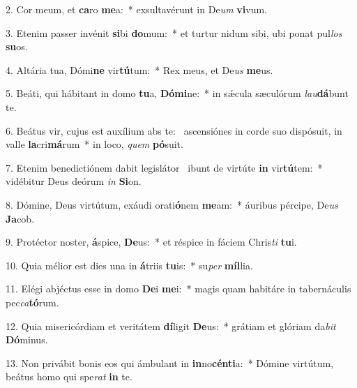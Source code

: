 2. Cor meum, et \textbf{ca}ro \textbf{me}a:~*  exsultavérunt in De\textit{um} \textbf{vi}vum.\

3. Etenim passer invénit \textbf{si}bi \textbf{do}mum:~*  et turtur nidum sibi, ubi ponat pul\textit{los} \textbf{su}os.\

4. Altária tua, Dómi\textbf{ne} vir\textbf{tú}tum:~*  Rex meus, et De\textit{us} \textbf{me}us.\

5. Beáti, qui hábitant in domo \textbf{tu}a, \textbf{Dó}\textbf{mi}ne:~*  in sǽcula sæculórum \textit{lau}\textbf{dá}bunt te.\

6. Beátus vir, cujus est auxílium abs te: \dag\  ascensiónes in corde suo dispósuit, in valle \textbf{la}cri\textbf{má}rum~*  in loco, \textit{quem} \textbf{pó}suit.\

7. Etenim benedictiónem dabit legislátor \dag\  ibunt de virtúte \textbf{in} vir\textbf{tú}tem:~*  vidébitur Deus deórum \textit{in} \textbf{Si}on.\

8. Dómine, Deus virtútum, exáudi orati\textbf{ó}nem \textbf{me}am:~*  áuribus pércipe, De\textit{us} \textbf{Ja}cob.\

9. Protéctor noster, \textbf{á}spice, \textbf{De}us:~*  et réspice in fáciem Chris\textit{ti} \textbf{tu}i.\

10. Quia mélior est dies una in \textbf{á}triis \textbf{tu}is:~*  su\textit{per} \textbf{míl}lia.\

11. Elégi abjéctus esse in domo \textbf{De}i \textbf{me}i:~*  magis quam habitáre in tabernáculis pec\textit{ca}\textbf{tó}rum.\

12. Quia misericórdiam et veritátem \textbf{dí}ligit \textbf{De}us:~*  grátiam et glóriam da\textit{bit} \textbf{Dó}minus.\

13. Non privábit bonis eos qui ámbulant in \textbf{in}no\textbf{cén}\textbf{ti}a:~*  Dómine virtútum, beátus homo qui spe\textit{rat} \textbf{in} te.\

